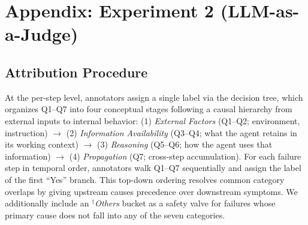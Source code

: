 \documentclass[11pt]{article}
\begin{document}
\clearpage
\section{Appendix: Experiment 2 (LLM-as-a-Judge)} \label{app:4}

\subsection{Attribution Procedure}
At the per-step level, annotators assign a single label via the decision tree, which organizes Q1--Q7 into four conceptual stages following a causal hierarchy from external inputs to internal behavior: (1) \textit{External Factors} (Q1--Q2; environment, instruction) $\rightarrow$ (2) \textit{Information Availability} (Q3--Q4; what the agent retains in its working context) $\rightarrow$ (3) \textit{Reasoning} (Q5--Q6; how the agent uses that information) $\rightarrow$ (4) \textit{Propagation} (Q7; cross-step accumulation). For each failure step in temporal order, annotators walk Q1--Q7 sequentially and assign the label of the first ``Yes'' branch. This top-down ordering resolves common category overlaps by giving upstream causes precedence over downstream symptoms. We additionally include an $^{\dagger}$\emph{Others} bucket as a safety valve for failures whose primary cause does not fall into any of the seven categories.
\end{document}
